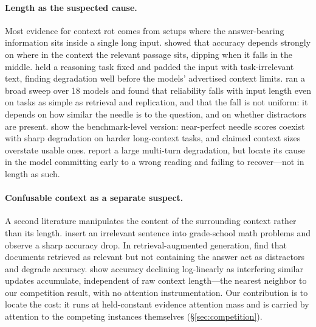 \documentclass{article}
\begin{document}
\paragraph{Length as the suspected cause.}
Most evidence for context rot comes from setups where the answer-bearing information sits inside
a single long input. \citet{liu2023lost} showed that accuracy depends strongly on where in
the context the relevant passage sits, dipping when it falls in the middle. \citet{levy2024same}
held a reasoning task fixed and padded the input with task-irrelevant text, finding degradation
well before the models' advertised context limits. \citet{hong2025contextrot} ran a broad sweep
over 18 models and found that reliability falls with input length even on tasks as simple as
retrieval and replication, and that the fall is not uniform: it depends on how similar the needle
is to the question, and on whether distractors are present. \citet{hsieh2024ruler} show the
benchmark-level version: near-perfect needle scores coexist with sharp degradation on harder
long-context tasks, and claimed context sizes overstate usable ones. \citet{laban2025lost} report a large
multi-turn degradation, but locate its cause in the model committing early to a wrong reading and
failing to recover---not in length as such.

\paragraph{Confusable context as a separate suspect.}
A second literature manipulates the content of the surrounding context rather than its
length. \citet{shi2023distracted} insert an irrelevant sentence into grade-school math problems
and observe a sharp accuracy drop. In retrieval-augmented generation, \citet{cuconasu2024noise}
find that documents retrieved as relevant but not containing the answer act as distractors and
degrade accuracy. \citet{wang2025unabletoforget} show accuracy declining log-linearly as
interfering similar updates accumulate, independent of raw context length---the nearest neighbor
to our competition result, with no attention instrumentation. Our contribution is to locate the
cost: it runs at held-constant evidence attention mass and is carried by attention to the
competing instances themselves (\S\ref{sec:competition}).
\end{document}
